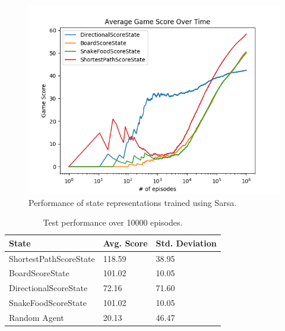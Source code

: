 \documentclass[result.tex]{subfiles}
\begin{document}
    \begin{figure}[ht]
        \centering
        \includegraphics[width=\linewidth]{../images/sarsa/state/42/state_sarsa_average_game_score_over_time.png}
        \caption{Performance of state representations trained using Sarsa.}
        \label{fig:state_sarsa}
    \end{figure}

    \begin{table}[ht]
        \centering
        \begin{tabular}{ | l | l | l | }
            \hline
            State & Avg. Score & Std. Deviation \\ \hline
            ShortestPathScoreState & 118.59 & 38.95 \\ \hline
            BoardScoreState & 101.02 & 10.05 \\ \hline
            DirectionalScoreState & 72.16 & 71.60 \\ \hline
            SnakeFoodScoreState & 101.02 & 10.05 \\
            Random Agent & 20.13 & 46.47 \\
            \hline
        \end{tabular}
        \caption{Test performance over 10000 episodes.}
        \label{table:state_sarsa}
    \end{table}
\end{document}
